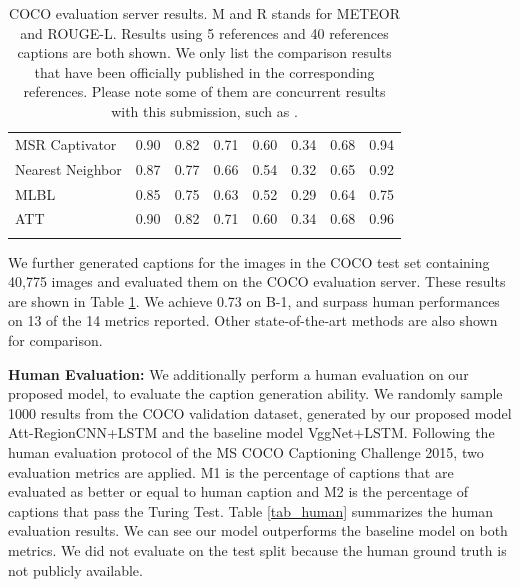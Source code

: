 \begin{table}[t!]
\begin{center}
{\begin{tabular}{ l c c c c c c c }
    MSR Captivator\cite{devlin2015language}&0.90&0.82&0.71&0.60&0.34&0.68&0.94\\
    Nearest Neighbor \cite{devlin2015exploring}&0.87&0.77&0.66&0.54&0.32&0.65&0.92\\
    MLBL \cite{kiros2014multimodal}&0.85&0.75&0.63&0.52&0.29&0.64&0.75\\
    ATT \cite{you2016image}&0.90&0.82&0.71&0.60&0.34&0.68&0.96\\
    \Xhline{2\arrayrulewidth}
  \end{tabular}}
  \vspace{-4pt}
  \caption{COCO evaluation server results. M and R stands for METEOR and ROUGE-L.
  Results using 5 references and 40 references captions are both shown. We only list the comparison results that have been officially published in the corresponding references. Please note some of them are concurrent results with this submission, such as \cite{you2016image}.}
  \label{tab3}
  \vspace{-23pt}
\end{center}
\end{table}

We further generated captions for the images in the COCO test set containing 40,775 images and evaluated them on the COCO evaluation server. These results are shown in Table \ref{tab3}. We achieve 0.73 on B-1, and surpass human performances on 13 of the 14 metrics reported. Other state-of-the-art methods are also shown for comparison.

\noindent\textbf{Human Evaluation:} We additionally perform a human evaluation on our proposed model, to evaluate the caption generation ability. We randomly sample 1000 results from the COCO validation dataset, generated by our proposed model Att-RegionCNN+LSTM and the baseline model VggNet+LSTM. Following the human evaluation protocol of the MS COCO Captioning Challenge 2015, two evaluation metrics are applied. M1 is the percentage of captions that are evaluated as better or equal to human caption and M2 is the percentage of captions that pass the Turing Test. Table \ref{tab_human} summarizes the human evaluation results. We can see our model outperforms the baseline model on both metrics. We did not evaluate on the test split because the human ground truth is not publicly available.

